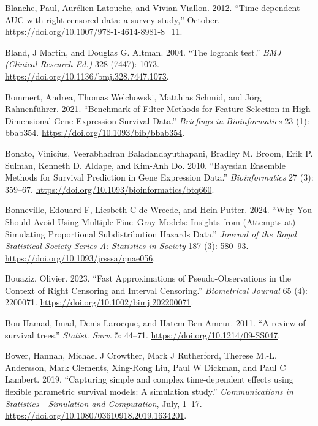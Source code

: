 \documentclass[
  letterpaper,
  krantz2]{style/krantz}
\newlength{\cslhangindent}
\newenvironment{CSLReferences}[2] %
 {\begin{list}{}{%
  \setlength{\itemindent}{0pt}
  \setlength{\leftmargin}{0pt}
  \setlength{\parsep}{0pt}
  \ifodd #1
   \setlength{\leftmargin}{\cslhangindent}
   \setlength{\itemindent}{-1\cslhangindent}
  \fi
  \setlength{\itemsep}{#2\baselineskip}}}
 {\end{list}}
\begin{document}
\begin{CSLReferences}{1}{0}
Blanche, Paul, Aurélien Latouche, and Vivian Viallon. 2012.
{``{Time-dependent AUC with right-censored data: a survey study},''}
October. \url{https://doi.org/10.1007/978-1-4614-8981-8_11}.

Bland, J Martin, and Douglas G. Altman. 2004. {``{The logrank test}.''}
\emph{BMJ (Clinical Research Ed.)} 328 (7447): 1073.
\url{https://doi.org/10.1136/bmj.328.7447.1073}.

Bommert, Andrea, Thomas Welchowski, Matthias Schmid, and Jörg
Rahnenführer. 2021. {``Benchmark of Filter Methods for Feature Selection
in High-Dimensional Gene Expression Survival Data.''} \emph{Briefings in
Bioinformatics} 23 (1): bbab354.
\url{https://doi.org/10.1093/bib/bbab354}.

Bonato, Vinicius, Veerabhadran Baladandayuthapani, Bradley M. Broom,
Erik P. Sulman, Kenneth D. Aldape, and Kim-Anh Do. 2010. {``Bayesian
Ensemble Methods for Survival Prediction in Gene Expression Data.''}
\emph{Bioinformatics} 27 (3): 359--67.
\url{https://doi.org/10.1093/bioinformatics/btq660}.

Bonneville, Edouard F, Liesbeth C de Wreede, and Hein Putter. 2024.
{``Why You Should Avoid Using Multiple {Fine}--{Gray} Models: Insights
from (Attempts at) Simulating Proportional Subdistribution Hazards
Data.''} \emph{Journal of the Royal Statistical Society Series A:
Statistics in Society} 187 (3): 580--93.
\url{https://doi.org/10.1093/jrsssa/qnae056}.

Bouaziz, Olivier. 2023. {``Fast Approximations of Pseudo-Observations in
the Context of Right Censoring and Interval Censoring.''}
\emph{Biometrical Journal} 65 (4): 2200071.
\url{https://doi.org/10.1002/bimj.202200071}.

Bou-Hamad, Imad, Denis Larocque, and Hatem Ben-Ameur. 2011. {``{A review
of survival trees}.''} \emph{Statist. Surv.} 5: 44--71.
\url{https://doi.org/10.1214/09-SS047}.

Bower, Hannah, Michael J Crowther, Mark J Rutherford, Therese M.-L.
Andersson, Mark Clements, Xing-Rong Liu, Paul W Dickman, and Paul C
Lambert. 2019. {``{Capturing simple and complex time-dependent effects
using flexible parametric survival models: A simulation study}.''}
\emph{Communications in Statistics - Simulation and Computation}, July,
1--17. \url{https://doi.org/10.1080/03610918.2019.1634201}.


\end{CSLReferences}
\end{document}

